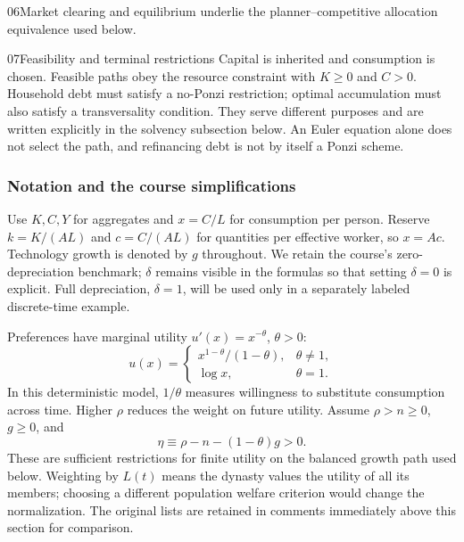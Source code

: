 \begin{modelsetup}[1]
\begin{modelcondition}{06}{Market clearing and equilibrium}
underlie the planner--competitive allocation equivalence used below.
\end{modelcondition}
\begin{modelcondition}{07}{Feasibility and terminal restrictions}
Capital is inherited and consumption is chosen. Feasible paths obey the
resource constraint with $K\geq0$ and $C>0$. Household debt must satisfy a
no-Ponzi restriction; optimal accumulation must also satisfy a transversality
condition. They serve different purposes and are written explicitly in the
solvency subsection below. An Euler equation alone does not select the path,
and refinancing debt is not by itself a Ponzi scheme.
\end{modelcondition}
\end{modelsetup}

\subsubsection{Notation and the course simplifications}

Use $K,C,Y$ for aggregates and $x=C/L$ for consumption per person. Reserve
$k=K/(AL)$ and $c=C/(AL)$ for quantities per effective worker, so $x=Ac$.
Technology growth is denoted by $g$ throughout. We retain the course's
zero-depreciation benchmark; $\delta$ remains visible in the formulas so that
setting $\delta=0$ is explicit. Full depreciation, $\delta=1$, will be used
only in a separately labeled discrete-time example.

Preferences have marginal utility $u'(x)=x^{-\theta}$, $\theta>0$:
\begin{equation}\label{eq:ramsey-utility}
u(x)=\begin{cases}
 x^{1-\theta}/(1-\theta),&\theta\ne1,\\
 \log x,&\theta=1.
\end{cases}
\end{equation}
In this deterministic model, $1/\theta$ measures willingness to substitute
consumption across time. Higher $\rho$ reduces the weight on future utility.
Assume $\rho>n\geq0$, $g\geq0$, and
\begin{equation}\label{eq:ramsey-effective-discount}
\eta\equiv\rho-n-(1-\theta)g>0.
\end{equation}
These are sufficient restrictions for finite utility on the balanced growth
path used below. Weighting by $L(t)$ means the dynasty values the utility of
all its members; choosing a different population welfare criterion would change
the normalization. The original lists are retained in comments immediately
above this section for comparison.

